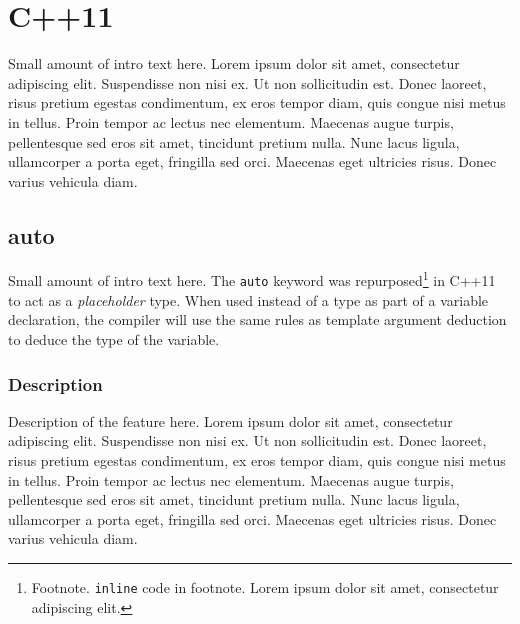 \documentclass[twoside,10pt,letterpaper,usenames]{newstyle-PearsonGeneric-7-38}
\author{}
\date{}
\newcommand{\passthrough}[1]{\texttt{#1}}
\begin{document}




% 
% 
% 



\section[C++11]{C++11}\label{c++11}

Small amount of intro text here. Lorem ipsum dolor sit amet, consectetur
adipiscing elit. Suspendisse non nisi ex. Ut non sollicitudin est. Donec
laoreet, risus pretium egestas condimentum, ex eros tempor diam, quis
congue nisi metus in tellus. Proin tempor ac lectus nec elementum.
Maecenas augue turpis, pellentesque sed eros sit amet, tincidunt pretium
nulla. Nunc lacus ligula, ullamcorper a porta eget, fringilla sed orci.
Maecenas eget ultricies risus. Donec varius vehicula diam.

\subsection[\tt{auto}]{{\SubsecCode auto}}\label{auto}

Small amount of intro text here. The \passthrough{auto}
keyword was repurposed{\cprotect\footnote{Footnote. \texttt{inline} code
  in footnote. Lorem ipsum dolor sit amet, consectetur adipiscing elit.}}
in C++11 to act as a \emph{placeholder} type. When used instead of a
type as part of a variable declaration, the {compiler} will use the same
rules as {template argument deduction} to deduce the type of the
variable.

\subsubsection[Description]{Description}\label{description}

Description of the feature here. Lorem ipsum dolor sit amet, consectetur
adipiscing elit. Suspendisse non nisi ex. Ut non sollicitudin est. Donec
laoreet, risus pretium egestas condimentum, ex eros tempor diam, quis
congue nisi metus in tellus. Proin tempor ac lectus nec elementum.
Maecenas augue turpis, pellentesque sed eros sit amet, tincidunt pretium
nulla. Nunc lacus ligula, ullamcorper a porta eget, fringilla sed orci.
Maecenas eget ultricies risus. Donec varius vehicula diam.
\end{document}
